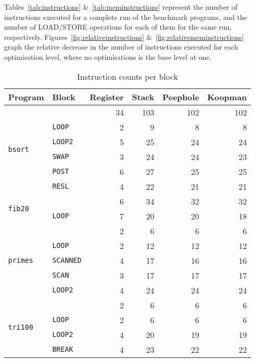 Tables~\ref{tab:instructions} \&~\ref{tab:meminstructions} represent the number
of instructions executed for a complete run of the benchmark programs, and the
number of LOAD/STORE operations for each of them for the same run, respectively.
Figures~\ref{fig:relativeinstructions} \&~\ref{fig:relativememinstructions}
graph the relative decrease in the number of instructions executed for each
optimisation level, where no optimisations is the base level at one.

\begin{table}
\begin{tabular}{l l r r r r}
  Program & Block & Register & Stack & Peephole & Koopman \\ \toprule
  \multirow{6}{*}{\texttt{bsort}}  & & 34 & 103 & 102 & 102 \\
  & \texttt{LOOP}                    &  2 &   9 &   8 &   8 \\
  & \texttt{LOOP2}                   &  5 &  25 &  24 &  24 \\
  & \texttt{SWAP}                    &  3 &  24 &  24 &  23 \\
  & \texttt{POST}                    &  6 &  27 &  25 &  25 \\
  & \texttt{RESL}                    &  4 &  22 &  21 &  21 \\ \midrule
  \multirow{2}{*}{\texttt{fib20}}  & &  6 &  34 &  32 &  32 \\
  & \texttt{LOOP}                    &  7 &  20 &  20 &  18 \\ \midrule
  \multirow{5}{*}{\texttt{primes}} & &  2 &   6 &   6 &   6 \\
  & \texttt{LOOP}                    &  2 &  12 &  12 &  12 \\
  & \texttt{SCANNED}                 &  4 &  17 &  16 &  16 \\
  & \texttt{SCAN}                    &  3 &  17 &  17 &  17 \\
  & \texttt{LOOP2}                   &  4 &  24 &  24 &  24 \\ \midrule
  \multirow{5}{*}{\texttt{tri100}} & &  2 &   6 &   6 &   6 \\
  & \texttt{LOOP}                    &  2 &   6 &   6 &   6 \\
  & \texttt{LOOP2}                   &  4 &  20 &  19 &  19 \\
  & \texttt{BREAK}                   &  4 &  23 &  22 &  22 \\
\end{tabular}
\caption{Instruction counts per block}\label{tab:instructionperblock}
\end{table}

